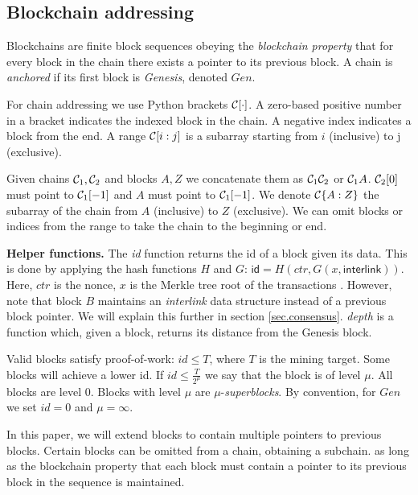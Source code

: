 \subsection{Blockchain addressing}
Blockchains are finite block sequences obeying the \textit{blockchain property}
that for every block in the chain there exists a pointer to its previous block.
A chain is \textit{anchored} if its first block is \textit{Genesis}, denoted
$Gen$.

For chain addressing we use Python brackets $\mathcal{C}[\cdot]$. A zero-based
positive number in a bracket indicates the indexed block in the chain. A
negative index indicates a block from the end. A range $\mathcal{C}[i:j]$ is a
subarray starting from $i$ (inclusive) to j (exclusive).

Given chains $\mathcal{C}_1, \mathcal{C}_2$ and blocks $A, Z$ we concatenate them as
$\mathcal{C}_1 \mathcal{C}_2$ or $\mathcal{C}_1 A$. $\mathcal{C}_2[0]$ must point to $\mathcal{C}_1[-1]$
and $A$ must point to $\mathcal{C}_1[-1]$. We denote $\mathcal{C}\{A:Z\}$ the subarray of
the chain from $A$ (inclusive) to $Z$ (exclusive). We can omit blocks or indices
from the range to take the chain to the beginning or end.

\textbf{Helper functions.} The \textit{id} function returns the id of a block
given its data. This is done by applying the hash functions $H$ and $G$:
$\textsf{id} = H(ctr, G(x, \textsf{interlink}))$. Here, $ctr$ is the nonce, $x$
is the Merkle tree root of the transactions \cite{princetonbook}. However, note
that block $B$ maintains an \textit{interlink} data structure instead of a
previous block pointer. We will explain this further in section
\ref{sec.consensus}. \textit{depth} is a function which, given a block, returns
its distance from the Genesis block.

Valid blocks satisfy proof-of-work\cite{antonopoulosbook}: $id \leq T$, where
$T$ is the mining target. Some blocks will achieve a lower id. If $id \leq
\frac{T}{2^\mu}$ we say that the block is of level $\mu$. All blocks are
level $0$. Blocks with level $\mu$ are $\mu$-\textit{superblocks}.
By convention, for $Gen$ we set $id = 0$ and $\mu = \infty$.

In this paper, we will extend blocks to contain multiple pointers to previous
blocks. Certain blocks can be omitted from a chain, obtaining a subchain. as
long as the blockchain property that each block must contain a pointer to its
previous block in the sequence is maintained.

